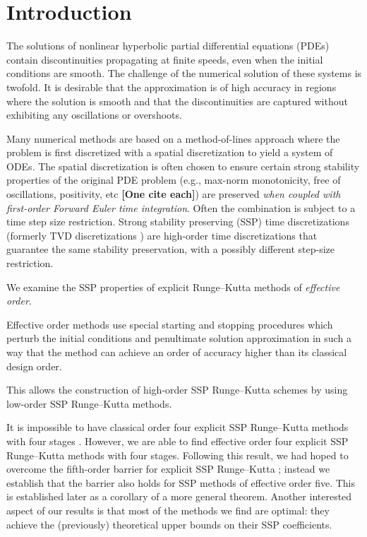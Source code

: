 \section{Introduction}\label{sec:Intro}

The solutions of nonlinear hyperbolic partial differential equations (PDEs) contain discontinuities propagating at finite speeds, even when the initial conditions are smooth.
The challenge of the numerical solution of these systems is twofold.
It is desirable that the approximation is of high accuracy in regions where the solution is smooth and that the discontinuities are captured without exhibiting any oscillations or overshoots.

Many numerical methods are based on a method-of-lines approach where the problem is first discretized with a spatial discretization to yield a system of ODEs.
The spatial discretization is often chosen to ensure certain strong stability properties of the original PDE problem (e.g., max-norm monotonicity, free of oscillations, positivity, etc {\bf [One cite each]}) are preserved \emph{when coupled with first-order Forward Euler time integration}.
Often the combination is subject to a time step size restriction.
Strong stability preserving (SSP) time discretizations (formerly TVD
discretizations \cite{Gottlieb1998}) are high-order time
discretizations that guarantee the same stability preservation, with a
possibly different step-size restriction.


We examine the SSP properties of explicit Runge--Kutta methods of
\emph{effective order}.

Effective order methods use special starting and stopping procedures
which perturb the initial conditions and penultimate solution
approximation in such a way that the method can achieve an order of
accuracy higher than its classical design order.

This allows the construction of high-order SSP Runge--Kutta schemes by
using low-order SSP Runge--Kutta methods.


It is impossible to have classical order four explicit SSP
Runge--Kutta methods with four stages \cite{Ruuth2002}.  However, we
are able to find effective order four explicit SSP Runge--Kutta
methods with four stages.
Following this result, we had hoped to overcome the fifth-order
barrier for explicit SSP Runge--Kutta \cite{Ruuth2002}; instead we
establish that the barrier also holds for SSP methods of effective
order five.
This is established later as a corollary of a more general theorem.
Another interested aspect of our results is that most of the methods
we find are optimal: they achieve the (previously) theoretical upper
bounds on their SSP coefficients.

